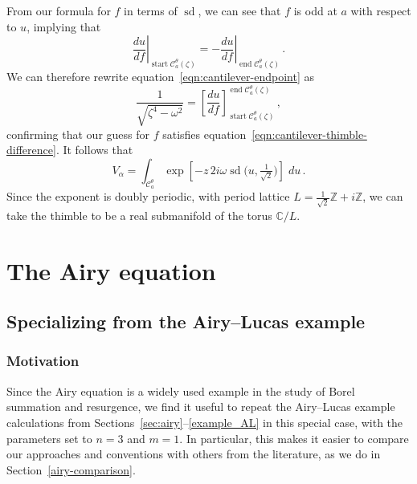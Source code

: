 \documentclass{article}
\newcommand{\Z}{\mathbb{Z}}
\newcommand{\C}{\mathbb{C}}
\theoremstyle{definition}
\theoremstyle{plain}
\begin{document}
From our formula for $f$ in terms of $\operatorname{sd}$, we can see that $f$ is odd at $a$ with respect to $u$, implying that
\[ \left.\frac{du}{df}\right|_{\operatorname{start} \mathcal{C}_a^\theta(\zeta)} = -\left.\frac{du}{df}\right|_{\operatorname{end} \mathcal{C}_a^\theta(\zeta)}\,. \]
We can therefore rewrite equation~\eqref{eqn:cantilever-endpoint} as
\[ \frac{1}{\sqrt{\zeta^4-\omega^2}} = \left[\frac{du}{df}\right]_{\operatorname{start} \mathcal{C}_a^\theta(\zeta)}^{\operatorname{end} \mathcal{C}_a^\theta(\zeta)}\,, \]
confirming that our guess for $f$ satisfies equation~\eqref{eqn:cantilever-thimble-difference}. It follows that
\[ V_\alpha = \int_{\mathcal{C}_a^\theta} \exp\left[ -z\,2i\omega \operatorname{sd}\big(u, \tfrac{1}{\sqrt{2}}\big) \right]\;du\,. \]
Since the exponent is doubly periodic, with period lattice $L = \tfrac{1}{\sqrt{2}}\Z + i\Z$, we can take the thimble to be a real submanifold of the torus $\C / L$.
%
\appendix
%
\section{The Airy equation}\label{airy-appendix}
\subsection{Specializing from the Airy--Lucas example}\label{sec:spec-to-airy}
\subsubsection{Motivation}
Since the Airy equation is a widely used example in the study of Borel summation and resurgence, we find it useful to repeat the Airy--Lucas example calculations from Sections~\ref{sec:airy}--\ref{example_AL} in this special case, with the parameters set to $n = 3$ and $m = 1$. In particular, this makes it easier to compare our approaches and conventions with others from the literature, as we do in Section~\ref{airy-comparison}.
\end{document}
